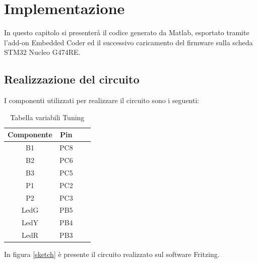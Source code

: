 \chapter{Implementazione}
    In questo capitolo si presenterà il codice generato da Matlab, esportato tramite l'add-on Embedded Coder ed il successivo caricamento del firmware sulla scheda STM32 Nucleo  G474RE.

    \section{Realizzazione del circuito}
        \noindent I componenti utilizzati per realizzare il circuito sono i seguenti:
        
        \begin{table}[H]
            \centering
                \begin{tabular}{ | c | c | c | c |} 
                    \hline
                            
                    \textbf{Componente} & \textbf{Pin} \\ 
                    \hline
                            
                    B1 & PC8\\ 
                    \hline
                            
                    B2 & PC6\\ 
                    \hline

                    B3 & PC5\\ 
                    \hline

                    P1 & PC2\\ 
                    \hline

                    P2 & PC3\\ 
                    \hline

                    LedG & PB5\\ 
                    \hline

                    LedY & PB4\\ 
                    \hline

                    LedR & PB3\\ 
                    \hline
                \end{tabular}
            \caption{Tabella variabili Tuning}
        \end{table}

        \noindent In figura \ref{sketch} è presente il circuito realizzato sul software Fritzing.

